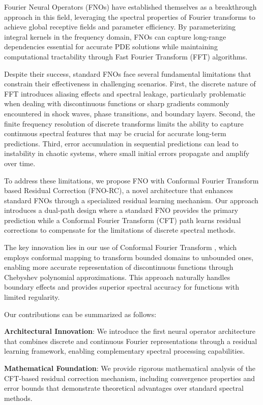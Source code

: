 \documentclass[11pt]{article}
\begin{document}
Fourier Neural Operators (FNOs) \citep{li2020fourier} have established themselves as a breakthrough approach in this field, leveraging the spectral properties of Fourier transforms to achieve global receptive fields and parameter efficiency. By parameterizing integral kernels in the frequency domain, FNOs can capture long-range dependencies essential for accurate PDE solutions while maintaining computational tractability through Fast Fourier Transform (FFT) algorithms.

Despite their success, standard FNOs face several fundamental limitations that constrain their effectiveness in challenging scenarios. First, the discrete nature of FFT introduces aliasing effects and spectral leakage, particularly problematic when dealing with discontinuous functions or sharp gradients commonly encountered in shock waves, phase transitions, and boundary layers. Second, the finite frequency resolution of discrete transforms limits the ability to capture continuous spectral features that may be crucial for accurate long-term predictions. Third, error accumulation in sequential predictions can lead to instability in chaotic systems, where small initial errors propagate and amplify over time.

To address these limitations, we propose FNO with Conformal Fourier Transform based Residual Correction (FNO-RC), a novel architecture that enhances standard FNOs through a specialized residual learning mechanism. Our approach introduces a dual-path design where a standard FNO provides the primary prediction while a Conformal Fourier Transform (CFT) path learns residual corrections to compensate for the limitations of discrete spectral methods.

The key innovation lies in our use of Conformal Fourier Transform \citep{barnett2010conformal}, which employs conformal mapping to transform bounded domains to unbounded ones, enabling more accurate representation of discontinuous functions through Chebyshev polynomial approximations. This approach naturally handles boundary effects and provides superior spectral accuracy for functions with limited regularity.

Our contributions can be summarized as follows:

\textbf{Architectural Innovation}: We introduce the first neural operator architecture that combines discrete and continuous Fourier representations through a residual learning framework, enabling complementary spectral processing capabilities.

\textbf{Mathematical Foundation}: We provide rigorous mathematical analysis of the CFT-based residual correction mechanism, including convergence properties and error bounds that demonstrate theoretical advantages over standard spectral methods.
\end{document}
